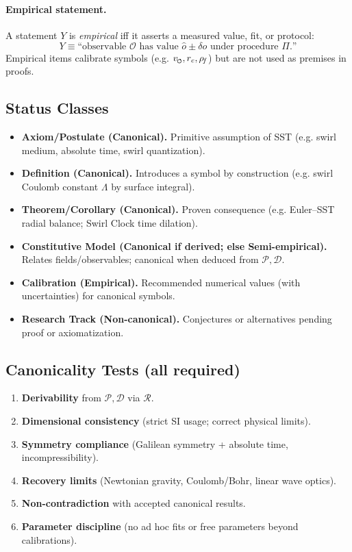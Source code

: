 \documentclass[11pt]{article}
\begin{document}
\paragraph{Empirical statement.}
    A statement $Y$ is \emph{empirical} iff it asserts a measured value, fit, or protocol:
    \[
        Y \equiv \text{“observable $\mathcal{O}$ has value $\hat{o}\pm \delta o$ under procedure $\Pi$.”}
    \]
    Empirical items calibrate symbols (e.g. $\vscore, \rc, \rhof$) but are not used as premises in proofs.

\subsection*{Status Classes}
\begin{itemize}
\item \textbf{Axiom/Postulate (Canonical).} Primitive assumption of SST (e.g. swirl medium, absolute time, swirl quantization).
\item \textbf{Definition (Canonical).} Introduces a symbol by construction (e.g. swirl Coulomb constant $\Lambda$ by surface integral).
\item \textbf{Theorem/Corollary (Canonical).} Proven consequence (e.g. Euler–SST radial balance; Swirl Clock time dilation).
\item \textbf{Constitutive Model (Canonical if derived; else Semi-empirical).} Relates fields/observables; canonical when deduced from $\mathcal{P},\mathcal{D}$.
\item \textbf{Calibration (Empirical).} Recommended numerical values (with uncertainties) for canonical symbols.
\item \textbf{Research Track (Non-canonical).} Conjectures or alternatives pending proof or axiomatization.
\end{itemize}

\subsection*{Canonicality Tests (all required)}
\begin{enumerate}
\item \textbf{Derivability} from $\mathcal{P},\mathcal{D}$ via $\mathcal{R}$.
\item \textbf{Dimensional consistency} (strict SI usage; correct physical limits).
\item \textbf{Symmetry compliance} (Galilean symmetry + absolute time, incompressibility).
\item \textbf{Recovery limits} (Newtonian gravity, Coulomb/Bohr, linear wave optics).
\item \textbf{Non-contradiction} with accepted canonical results.
\item \textbf{Parameter discipline} (no ad hoc fits or free parameters beyond calibrations).
\end{enumerate}
\end{document}
